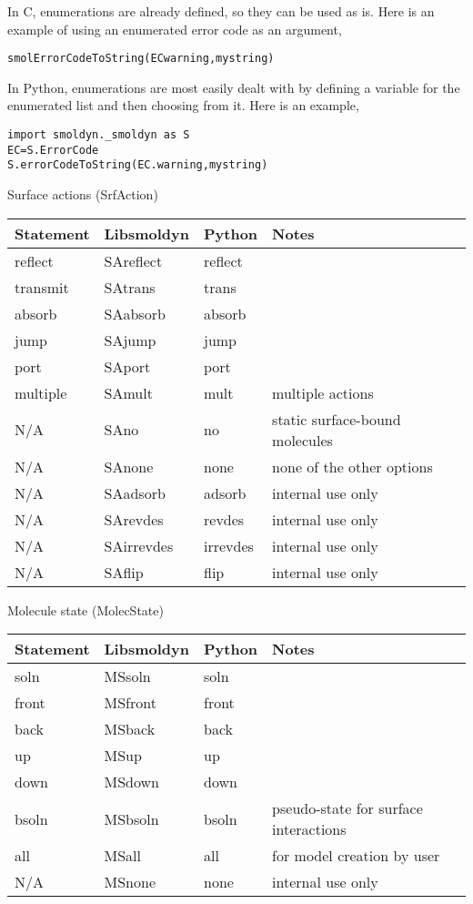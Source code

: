 \documentclass {book}
\begin{document}
In C, enumerations are already defined, so they can be used as is. Here is an example of using an enumerated error code as an argument,
\begin{lstlisting}
smolErrorCodeToString(ECwarning,mystring)
\end{lstlisting}

In Python, enumerations are most easily dealt with by defining a variable for the enumerated list and then choosing from it. Here is an example,
\begin{lstlisting}
import smoldyn._smoldyn as S
EC=S.ErrorCode
S.errorCodeToString(EC.warning,mystring)
\end{lstlisting}

Surface actions (SrfAction)
\begin{longtable}[c]{llll}
Statement & Libsmoldyn & Python & Notes\\
\hline
reflect & SAreflect & reflect\\
transmit & SAtrans & trans\\
absorb & SAabsorb & absorb\\
jump & SAjump & jump\\
port & SAport & port\\
multiple & SAmult & mult & multiple actions\\
N/A & SAno & no & static surface-bound molecules\\
N/A & SAnone & none & none of the other options\\
N/A & SAadsorb & adsorb & internal use only\\
N/A & SArevdes & revdes & internal use only\\
N/A & SAirrevdes & irrevdes & internal use only\\
N/A & SAflip & flip & internal use only
\end{longtable}

Molecule state (MolecState)
\begin{longtable}[c]{llll}
Statement & Libsmoldyn & Python & Notes\\
\hline
soln & MSsoln & soln\\
front & MSfront & front\\
back & MSback & back\\
up & MSup & up\\
down & MSdown & down\\
bsoln & MSbsoln & bsoln & pseudo-state for surface interactions\\
all & MSall & all & for model creation by user\\
N/A & MSnone & none & internal use only
\end{longtable}
\end{document}
